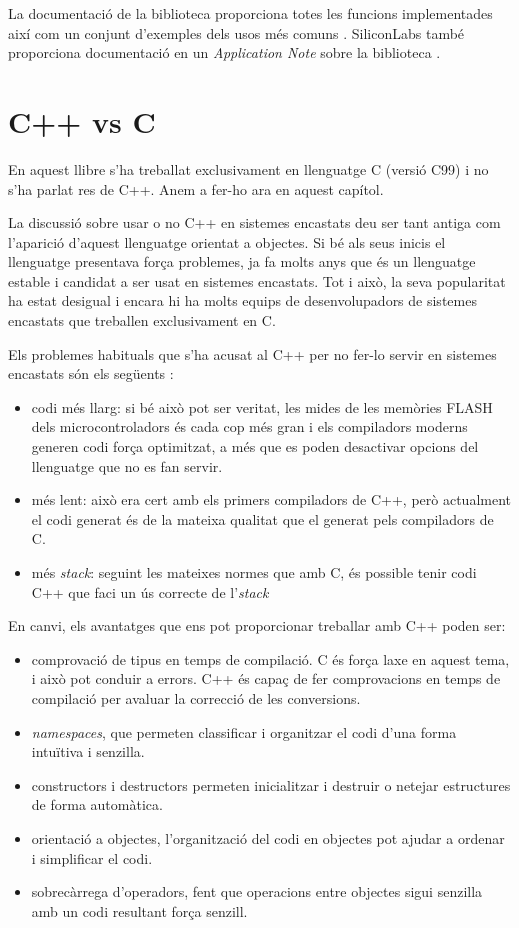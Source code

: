 La documentació de la biblioteca proporciona totes les funcions implementades així com un conjunt d'exemples dels usos més comuns \cite{CORE-DSP}. SiliconLabs també proporciona documentació en un {\em Application Note} sobre la biblioteca \cite{AN0051}.

\chapter{C++ vs C}
\label{ch:CvsCPP}
En aquest llibre s'ha treballat exclusivament en llenguatge C (versió C99) i no s'ha parlat res de C++. Anem a fer-ho ara en aquest capítol.

La discussió sobre usar o no C++ en sistemes encastats deu ser tant antiga com l'aparició d'aquest llenguatge orientat a objectes. Si bé als seus inicis el llenguatge presentava força problemes, ja fa molts anys que és un llenguatge estable i candidat a ser usat en sistemes encastats. Tot i això, la seva popularitat ha estat desigual i encara hi ha molts equips de desenvolupadors de sistemes encastats que treballen exclusivament en C.

Els problemes habituals que s'ha acusat al C++ per no fer-lo servir en sistemes encastats són els següents \cite{CXX_1}:
\begin{itemize}
 \item codi més llarg: si bé això pot ser veritat, les mides de les memòries \gls{FLASH} dels microcontroladors és cada cop més gran i els compiladors moderns generen codi força optimitzat, a més que es poden desactivar opcions del llenguatge que no es fan servir.
 \item més lent: això era cert amb els primers compiladors de C++, però actualment el codi generat és de la mateixa qualitat que el generat pels compiladors de C.
 \item més {\em stack}: seguint les mateixes normes que amb C, és possible tenir codi C++ que faci un ús correcte de l'{\em stack}
\end{itemize}

En canvi, els avantatges que ens pot proporcionar treballar amb C++ poden ser:
\begin{itemize}
 \item comprovació de tipus en temps de compilació. C és força laxe en aquest tema, i això pot conduir a errors. C++ és capaç de fer comprovacions en temps de compilació per avaluar la correcció de les conversions.
 \item {\em namespaces}, que permeten classificar i organitzar el codi d'una forma intuïtiva i senzilla.
 \item constructors i destructors permeten inicialitzar i destruir o netejar estructures de forma automàtica.
 \item orientació a objectes, l'organització del codi en objectes pot ajudar a ordenar i simplificar el codi.
 \item sobrecàrrega d'operadors, fent que operacions entre objectes sigui senzilla amb un codi resultant força senzill.
\end{itemize}

